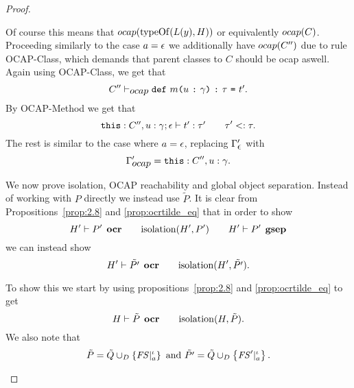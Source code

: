 \begin{proof}
\begin{description}
\begin{description}
          Of course this means that $\mbox{$ocap$}(\mbox{$\mathrm{typeOf}$}(L(y), H))$ or equivalently
          $\mbox{$ocap$}(C)$. Proceeding similarly to the case $a = \mbox{$\epsilon$}$ we
          additionally have $\mbox{$ocap$}(C'')$ due to rule {\sc OCAP-Class}, which
          demands that parent classes to $C$ should be ocap aswell. Again using
          {\sc OCAP-Class}, we get that 
          \begin{equation}
            C'' \vdash_{\mbox{$ocap$}} \mbox{\mdseries\texttt{def}~$m$\texttt{(}$u$~\texttt{:}~$\gamma$\texttt{)}~\texttt{:}~$\tau$~\texttt{=}~$t'$}.
          \end{equation}
          By {\sc OCAP-Method} we get that 
          \begin{equation} \label{eq:ecall-hp9}
            \mbox{$\mbox{\mdseries\texttt{this}}: C'', u: \gamma;\mbox{$\epsilon$}\vdash t':\tau'$}
            \quad\quad \tau' <: \tau.
          \end{equation}
          The rest is similar to the case where $a = \mbox{$\epsilon$}$,
          replacing $\Gamma_{\mbox{$\epsilon$}}'$ with 
          \begin{equation}
            \Gamma'_{\mbox{$ocap$}} = \mbox{\mdseries\texttt{this}}: C'', u: \gamma.
          \end{equation}

          We now prove isolation, OCAP reachability and global object
          separation. Instead of working with $P$ directly we instead use
          $\tilde{P}$. It is clear from Propositions~\ref{prop:2.8} and
          \ref{prop:ocrtilde_eq} that in order to show 
          \begin{equation}
            H' \vdash P' \:\: \mbox{\bf ocr} \quad\quad \mbox{$\mathrm{isolation}$}(H', P') \quad\quad H'
            \vdash P' \:\: \mbox{\bf gsep}
          \end{equation}
          we can instead show
          \begin{equation}
            H' \vdash \tilde{P'} \:\: \mbox{\bf ocr} \quad\quad \mbox{$\mathrm{isolation}$}(H', \tilde{P'}).
          \end{equation}

          To show this we start by using propositions~\ref{prop:2.8} and
          \ref{prop:ocrtilde_eq} to get
          \begin{equation}
            H \vdash \tilde{P} \:\: \mbox{\bf ocr} \quad\quad \mbox{$\mathrm{isolation}$}(H, \tilde{P}).
          \end{equation}
          We also note that 
          \begin{equation}
            \tilde{P} = \tilde{Q} \cup_D \left\{ \mathit{FS}|_a^\iota \right\} \text{ and }
            \tilde{P'} = \tilde{Q} \cup_D \left\{ \mathit{FS}'|_a^\iota \right\}.
          \end{equation}


\end{description}
\end{description}
\end{proof}
